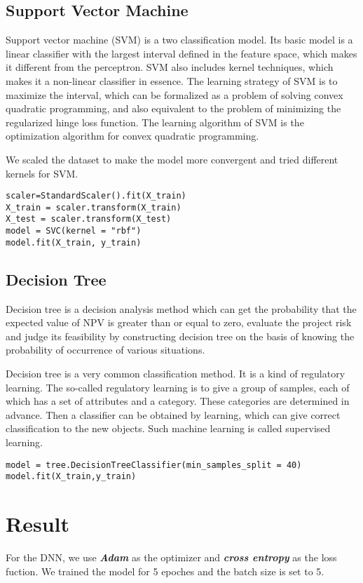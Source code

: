 \documentclass[12pt]{report}
\begin{document}
\subsection{Support Vector Machine}
Support vector machine (SVM) is a two classification model. Its basic model is a linear classifier with the largest interval defined in the feature space, which makes it different from the perceptron. SVM also includes kernel techniques, which makes it a non-linear classifier in essence. The learning strategy of SVM is to maximize the interval, which can be formalized as a problem of solving convex quadratic programming, and also equivalent to the problem of minimizing the regularized hinge loss function. The learning algorithm of SVM is the optimization algorithm for convex quadratic programming.

We scaled the dataset to make the model more convergent and tried different kernels for SVM.
\begin{lstlisting}
scaler=StandardScaler().fit(X_train)
X_train = scaler.transform(X_train)
X_test = scaler.transform(X_test)
model = SVC(kernel = "rbf")
model.fit(X_train, y_train)
\end{lstlisting}
\subsection{Decision Tree}
Decision tree is a decision analysis method which can get the probability that the expected value of NPV is greater than or equal to zero, evaluate the project risk and judge its feasibility by constructing decision tree on the basis of knowing the probability of occurrence of various situations. 

Decision tree is a very common classification method. It is a kind of regulatory learning. The so-called regulatory learning is to give a group of samples, each of which has a set of attributes and a category. These categories are determined in advance. Then a classifier can be obtained by learning, which can give correct classification to the new objects. Such machine learning is called supervised learning.
\begin{lstlisting}
model = tree.DecisionTreeClassifier(min_samples_split = 40)
model.fit(X_train,y_train)
\end{lstlisting}
\section{Result}
For the DNN, we use \textbf{\textit{Adam}} as the optimizer and \textbf{\textit{cross entropy}} as the loss fuction. We trained the model for 5 epoches and the batch size is set to 5.
\end{document}
